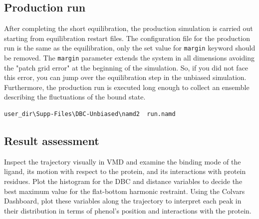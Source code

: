 \documentclass[9pt,tutorial]{livecoms}
\begin{document}
\subsection{Production run}\label{section 6.4}
After completing the short equilibration, the production simulation is carried out starting from equilibration restart files. The configuration file for the production run is the same as the equilibration, only the set value for \texttt{margin} keyword should be removed. The \texttt{margin} parameter extends the system in all dimensions avoiding the "patch grid error" at the beginning of the simulation. So, if you did not face this error, you can jump over the equilibration step in the unbiased simulation. Furthermore, the production run is executed long enough to collect an ensemble describing the fluctuations of the bound state.
\begin{verbatim}
user_dir\Supp-Files\DBC-Unbiased\namd2  run.namd
\end{verbatim}

\subsection{Result assessment}

Inspect the trajectory visually in VMD and examine the binding mode of the ligand, its motion with respect to the protein, and its interactions with  protein residues.
Plot the histogram for the DBC and distance variables to decide the best maximum value for the flat-bottom harmonic restraint.
Using the Colvars Dashboard, plot these variables along the trajectory to interpret each peak in their distribution in terms of phenol's position and interactions with the protein.

\end{document}
